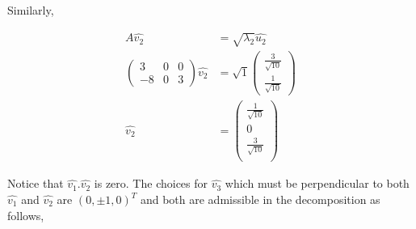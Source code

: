\documentclass[11pt, a4paper]{article}
\begin{document}
Similarly,

\begin{align*}
	A\hat{v_2} &= \sqrt{\lambda_2}\hat{u_2} \\
	\begin{pmatrix}
	3  & 0 & 0 \\
	-8 & 0 & 3 
	\end{pmatrix}\hat{v_2} &= \sqrt{1}\begin{pmatrix}
	\frac{3}{\sqrt{10}} \\
	\frac{1}{\sqrt{10}}
	\end{pmatrix} \\
	\hat{v_2} &= \begin{pmatrix}
	\frac{1}{\sqrt{10}} \\
	0 \\
	\frac{3}{\sqrt{10}} \\
	\end{pmatrix}
\end{align*}

Notice that $\hat{v_1}.\hat{v_2}$ is zero. The choices for $\hat{v_3}$ which must be perpendicular to both $\hat{v_1}$ and $\hat{v_2}$ are $(0, \pm 1, 0)^T$ and both are admissible in the decomposition as follows,
\end{document}
